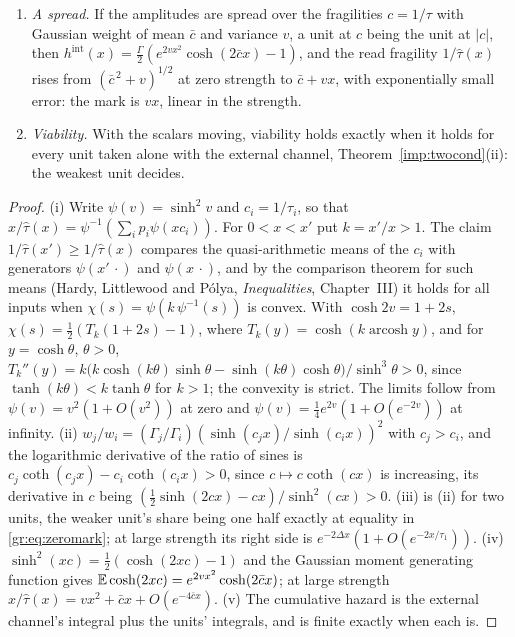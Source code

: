 \begin{proposition}
\begin{enumerate}
\begin{equation}
x^\times=\frac{\log(\Gamma_1/\Gamma_2)}{2\Delta}+o(1)
\qquad(\Gamma_2/\Gamma_1\to0).
\end{equation}
\item[(iv)] \emph{A spread.} If the amplitudes are spread over the
fragilities $c=1/\tau$ with Gaussian weight of mean $\bar c$ and variance
$v$, a unit at $c$ being the unit at $|c|$, then
$h^{\mathrm{int}}(x)=\tfrac{\Gamma}{2}(e^{2vx^2}\cosh(2\bar cx)-1)$, and the
read fragility $1/\hat\tau(x)$ rises from $(\bar c^{\,2}+v)^{1/2}$ at zero
strength to $\bar c+vx$, with exponentially small error: the mark is
$vx$, linear in the strength.
\item[(v)] \emph{Viability.} With the scalars moving, viability holds
exactly when it holds for every unit taken alone with the external
channel, Theorem~\ref{imp:twocond}(ii): the weakest unit decides.
\end{enumerate}
\end{proposition}

\begin{proof}
(i) Write $\psi(v)=\sinh^2v$ and $c_i=1/\tau_i$, so that
$x/\hat\tau(x)=\psi^{-1}(\sum_ip_i\psi(xc_i))$. For $0<x<x'$ put $k=x'/x>1$.
The claim $1/\hat\tau(x')\ge1/\hat\tau(x)$ compares the quasi-arithmetic
means of the $c_i$ with generators $\psi(x'\,\cdot)$ and $\psi(x\,\cdot)$,
and by the comparison theorem for such means (Hardy, Littlewood and
P\'olya, \emph{Inequalities}, Chapter~III) it holds for all inputs when
$\chi(s)=\psi(k\,\psi^{-1}(s))$ is convex. With $\cosh2v=1+2s$,
$\chi(s)=\tfrac12(T_k(1+2s)-1)$, where $T_k(y)=\cosh(k\operatorname{arcosh}y)$,
and for $y=\cosh\theta$, $\theta>0$,
$T_k''(y)=k\bigl(k\cosh(k\theta)\sinh\theta-\sinh(k\theta)\cosh\theta\bigr)/\sinh^3\theta>0$,
since $\tanh(k\theta)<k\tanh\theta$ for $k>1$; the convexity is strict. The
limits follow from $\psi(v)=v^2(1+O(v^2))$ at zero and
$\psi(v)=\tfrac14e^{2v}(1+O(e^{-2v}))$ at infinity. (ii)
$w_j/w_i=(\Gamma_j/\Gamma_i)(\sinh(c_jx)/\sinh(c_ix))^2$ with $c_j>c_i$, and
the logarithmic derivative of the ratio of sines is
$c_j\coth(c_jx)-c_i\coth(c_ix)>0$, since $c\mapsto c\coth(cx)$ is
increasing, its derivative in $c$ being
$(\tfrac12\sinh(2cx)-cx)/\sinh^2(cx)>0$. (iii) is (ii) for two units, the
weaker unit's share being one half exactly at equality in
\eqref{gr:eq:zeromark}; at large strength its right side is
$e^{-2\Delta x}(1+O(e^{-2x/\tau_1}))$. (iv)
$\sinh^2(xc)=\tfrac12(\cosh(2xc)-1)$ and the Gaussian moment generating
function gives $\mathbb{E}\cosh(2xc)=e^{2vx^2}\cosh(2\bar cx)$; at large strength
$x/\hat\tau(x)=vx^2+\bar cx+O(e^{-4\bar cx})$. (v) The cumulative hazard is
the external channel's integral plus the units' integrals, and is finite
exactly when each is.
\end{proof}

